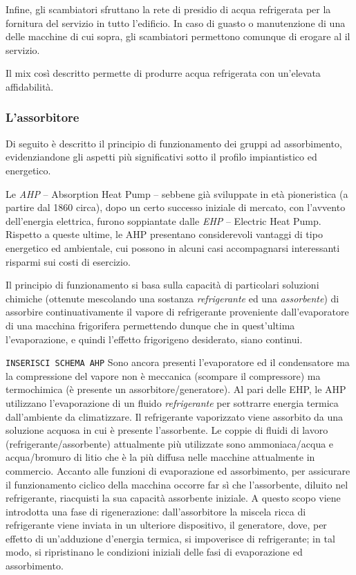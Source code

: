 Infine, gli scambiatori sfruttano la rete di presidio di acqua refrigerata per la fornitura del servizio in tutto l'edificio. In caso di guasto o manutenzione di una delle macchine di cui sopra, gli scambiatori permettono comunque di erogare al  il servizio.

Il mix così descritto permette di produrre acqua refrigerata con un'elevata affidabilità.
\subsubsection{L'assorbitore}
Di seguito è descritto il principio di funzionamento dei gruppi ad assorbimento, evidenziandone gli aspetti più significativi sotto il profilo impiantistico ed energetico. 

Le \emph{AHP} -- Absorption Heat Pump -- sebbene già sviluppate in età pioneristica (a partire dal 1860 circa), dopo un certo successo iniziale di mercato, con l'avvento dell'energia elettrica, furono soppiantate dalle \emph{EHP} -- Electric Heat Pump. Rispetto a queste ultime, le AHP presentano considerevoli vantaggi di tipo energetico ed ambientale, cui possono in alcuni casi accompagnarsi interessanti risparmi sui costi di esercizio.

Il principio di funzionamento si basa sulla capacità di particolari soluzioni chimiche (ottenute mescolando una sostanza \emph{refrigerante} ed una \emph{assorbente}) di assorbire continuativamente il vapore di refrigerante proveniente dall'evaporatore di una macchina frigorifera permettendo dunque che in quest'ultima l'evaporazione, e quindi l'effetto frigorigeno desiderato, siano continui.

\texttt{INSERISCI SCHEMA AHP} Sono ancora presenti l'evaporatore ed il condensatore ma la compressione del vapore non è meccanica (scompare il compressore) ma termochimica (è presente un assorbitore/generatore). Al pari delle EHP, le AHP utilizzano l'evaporazione di un fluido \emph{refrigerante} per sottrarre energia termica dall'ambiente da climatizzare. Il refrigerante vaporizzato viene assorbito da una soluzione acquosa in cui è presente l'assorbente. Le coppie di fluidi di lavoro (refrigerante/assorbente) attualmente più utilizzate sono ammoniaca/acqua e acqua/bromuro di litio che è la più diffusa nelle macchine attualmente in commercio. Accanto alle funzioni di evaporazione ed assorbimento, per assicurare il funzionamento ciclico della macchina occorre far sì che l'assorbente, diluito nel refrigerante, riacquisti la sua capacità assorbente iniziale. A questo scopo viene introdotta una fase di rigenerazione: dall'assorbitore la miscela ricca di refrigerante viene inviata in un ulteriore dispositivo, il generatore, dove, per effetto di un'adduzione d'energia termica, si impoverisce di refrigerante; in tal modo, si ripristinano le condizioni iniziali delle fasi di evaporazione ed assorbimento.

